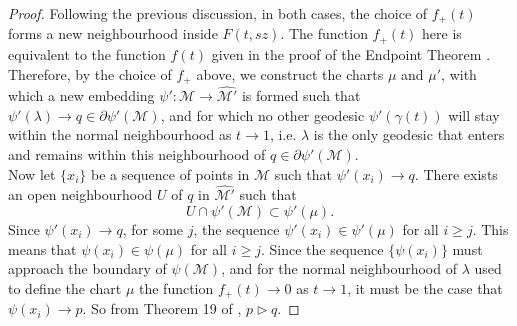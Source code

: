 \documentclass[pdflatex,sn-mathphys-num]{sn-jnl}
\theoremstyle{definition}
\begin{document}
\begin{proof}
Following the previous discussion, in both cases, the choice of $f_+(t)$ forms a new neighbourhood inside $F(t,sz)$. The function $f_+(t)$ here is equivalent to the function $f(t)$ given in the proof of the Endpoint Theorem \cite{Scott_2021}. Therefore, by the choice of $f_{+}$ above, we construct the charts $\mu$ and $\mu'$, with which a new embedding $\psi': \mathcal{M} \rightarrow \hat{\mathcal{M}'}$ is formed such that $\psi'(\lambda) \rightarrow q \in \partial\psi'(\mathcal{M})$, and for which no other geodesic $\psi'(\gamma(t))$ will stay within the normal neighbourhood as $t \rightarrow 1$, i.e. $\lambda$ is the only geodesic that enters and remains within this neighbourhood of $q \in \partial\psi'(\mathcal{M})$.\\

Now let $\{x_i\}$ be a sequence of points in $\mathcal{M}$ such that $\psi'(x_i) \rightarrow q$. There exists an open neighbourhood $U$ of $q$ in $\hat{\mathcal{M}'}$ such that $$ U \cap \psi'(\mathcal{M}) \subset \psi'(\mu).$$ Since $\psi'(x_i) \rightarrow q$, for some $j$, the sequence $\psi'(x_i) \in \psi'(\mu)$ for all $i \geq j$. This means that $\psi(x_i) \in \psi(\mu)$ for all $i \geq j$. Since the sequence $\{\psi(x_i)\}$ must approach the boundary of $\psi(\mathcal{M})$, and for the normal neighbourhood of $\lambda$ used to define the chart $\mu$ the function $f_{+}(t) \rightarrow 0$ as $t \rightarrow 1$, it must be the case that $\psi(x_i) \rightarrow p$. So from Theorem 19 of \cite{scott1994abstract}, $p \vartriangleright q$.




\end{proof}
\end{document}
